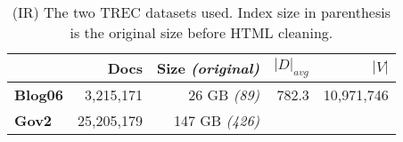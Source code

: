 \begin{table}
\centering
{\small
\begin{tabular}{|l|r|r|r|r|}
    \hline & \textbf{Docs} & \textbf{Size} \emph{(original)} & \textbf{$|D|_{avg}$} &
    \textbf{$|V|$} \\
    \hline
    \textbf{Blog06} & 3,215,171 & 26 GB \emph{(89)} & 782.3 & 10,971,746 \\
    \textbf{Gov2} & 25,205,179 & 147 GB \emph{(426)} & & \\
    \hline
\end{tabular}
\caption{(IR) The two TREC datasets used. Index size in parenthesis is the
original size before HTML cleaning.}
\label{table:ir-datasets}
}
\end{table}
